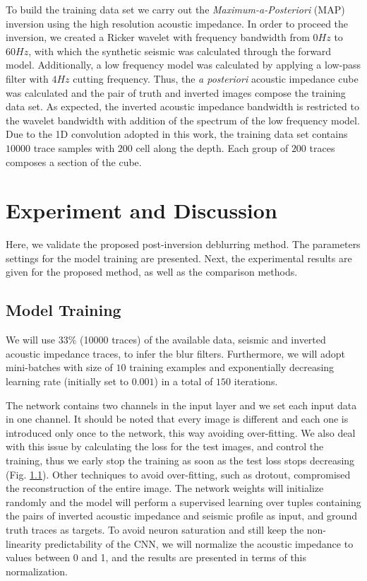 \documentclass[journal]{IEEEtran}
\begin{document}
To build the training data set we carry out the \textit{Maximum-a-Posteriori} (MAP)
\cite{Buland2003,Figueiredo2012} inversion using the high resolution acoustic
impedance. In order to proceed the inversion, we created a Ricker wavelet with
frequency bandwidth from $0Hz$ to $60Hz$, with which the synthetic seismic was
calculated through the forward model. Additionally, a low frequency
model was calculated by applying a low-pass filter with $4Hz$ cutting frequency.
Thus, the \textit{a posteriori} acoustic impedance cube was calculated and the pair of truth
and inverted images compose the training data set. As expected, the inverted
acoustic impedance bandwidth is restricted to the wavelet bandwidth with
addition of the spectrum of the low frequency model. Due to the 1D
convolution adopted in this work, the training data set contains $10000$ trace
samples with $200$ cell along the depth. Each group of $200$ traces composes
a section of the cube.

\section{Experiment and Discussion}\label{Experiments}
Here, we validate the proposed post-inversion deblurring method.
The parameters settings for the model training are presented.
Next, the experimental results are given for the proposed method,
as well as the comparison methods.

\subsection{Model Training}
We will use 33\% (10000 traces)
of the available data, seismic and inverted acoustic impedance traces,
to infer the blur filters. Furthermore, we will adopt 
mini-batches with size of $10$ training examples and exponentially
decreasing learning rate (initially set to $0.001$)
in a total of $150$ iterations.

The network contains two channels in the input layer and we set
each input data in one channel.
It should be noted that every image is different and each
one is introduced only once to the network, this way avoiding
over-fitting. We also deal with this issue by calculating
the loss for the test images, and control the training,
thus we early stop the training as soon as the test loss
stops decreasing (Fig. \ref{}).
Other techniques to avoid over-fitting, such as
drotout, compromised the reconstruction of the entire image.
The network weights
will initialize randomly and the model will perform a supervised
learning over tuples containing the pairs of inverted acoustic
impedance and seismic profile as input, and ground truth traces as targets.
To avoid neuron saturation and still keep the non-linearity predictability
of the CNN, we will normalize the acoustic impedance to values between 0 and 1,
and the results are presented in terms of this normalization.
\end{document}
